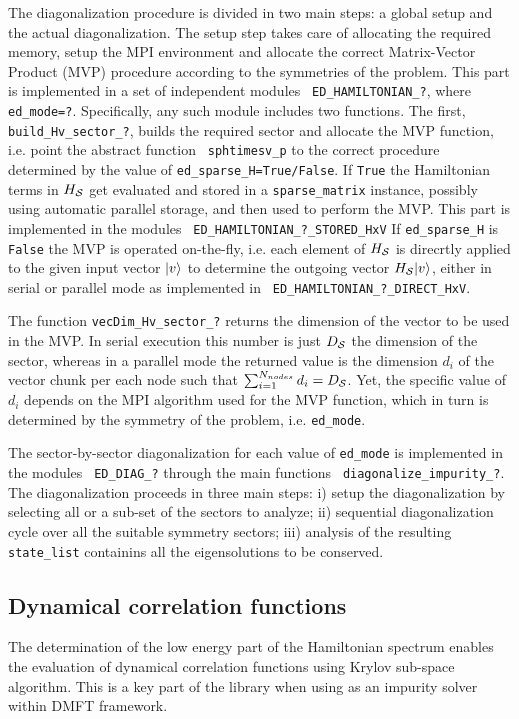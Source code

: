 \documentclass[edipack2.tex]{subfiles}
\begin{document}
The diagonalization procedure is divided in two main steps: a global
setup and the actual diagonalization.
%
The setup step takes care of allocating the required memory,
setup the MPI environment and allocate the correct 
Matrix-Vector Product (MVP) procedure according to the symmetries of
the problem. 
This part is implemented in a set of independent modules  {\tt
  ED\_HAMILTONIAN\_?}, where {\tt ed\_mode=?}.
Specifically, any such module includes two functions.
The first, {\tt  build\_Hv\_sector\_?}, builds the required sector and
allocate the MVP function, i.e. point the abstract function {\tt
  sphtimesv\_p} to the correct procedure determined by the value of
{\tt ed\_sparse\_H=True/False}.
If {\tt True} the Hamiltonian terms in $H_{\cal S}$
get evaluated and stored in a {\tt sparse\_matrix} instance, possibly
using automatic parallel storage, and then used to perform
the MVP. This part is implemented in the modules {\tt
  ED\_HAMILTONIAN\_?\_STORED\_HxV}
If {\tt ed\_sparse\_H} is {\tt False} the MVP is operated on-the-fly,
i.e. each element of $H_{\cal S}$ is direcrtly applied to the given input
vector $|v\rangle$ to determine the outgoing vector $H_{\cal S}|v\rangle$,
either in serial or parallel mode as implemented in {\tt
  ED\_HAMILTONIAN\_?\_DIRECT\_HxV}.  



The function {\tt vecDim\_Hv\_sector\_?} returns the 
dimension of the vector to be used in the
MVP. In serial execution this number is just $D_{\cal S}$ the dimension of
the sector, whereas in a parallel mode the returned value is the
dimension $d_i$ of the vector chunk per each node such that
$\sum_{i=1}^{N_{nodes}}d_i = D_{\cal S}$. Yet, the specific value of $d_i$
depends on the MPI algorithm used for the MVP function, which in turn
is determined by the symmetry of the problem, i.e. {\tt ed\_mode}.


The sector-by-sector diagonalization for each
value of {\tt ed\_mode} is implemented in the modules {\tt
  ED\_DIAG\_?} through the main functions {\tt
  diagonalize\_impurity\_?}. The diagonalization proceeds in three main
steps: i) setup the diagonalization by selecting all or a sub-set of the
sectors to analyze; ii) sequential diagonalization cycle over all the suitable symmetry
sectors; iii) analysis of the resulting {\tt state\_list} containins
all the eigensolutions to be conserved.




\subsection{Dynamical correlation functions}\label{sSecGF}
The determination of the low energy part of the Hamiltonian spectrum
enables the evaluation of dynamical correlation functions using Krylov
sub-space algorithm.
This is a key part of the library when using \NAME as an impurity
solver within DMFT framework. 
\end{document}
